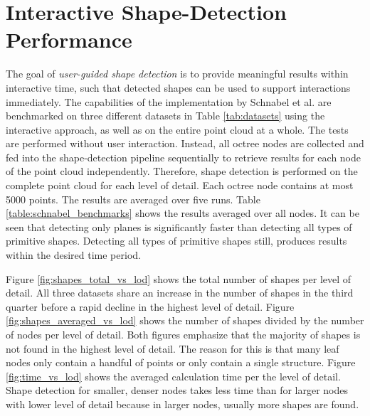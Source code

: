 \section{Interactive Shape-Detection Performance}
\label{sec:shape_detection_performance}

The goal of \textit{user-guided shape detection} is to provide meaningful results within interactive time, such that detected shapes can be used to support interactions immediately. The capabilities of the implementation by Schnabel et al. \cite{schnabel-2007-software} are benchmarked on three different datasets in Table \ref{tab:datasets} using the interactive approach, as well as on the entire point cloud at a whole. The tests are performed without user interaction. Instead, all octree nodes are collected and fed into the shape-detection pipeline sequentially to retrieve results for each node of the point cloud independently. Therefore, shape detection is performed on the complete point cloud for each level of detail. Each octree node contains at most 5000 points. The results are averaged over five runs. Table \ref{table:schnabel_benchmarks} shows the results averaged over all nodes. It can be seen that detecting only planes is significantly faster than detecting all types of primitive shapes. Detecting all types of primitive shapes still, produces results within the desired time period. 

\par

Figure \ref{fig:shapes_total_vs_lod} shows the total number of shapes per level of detail. All three datasets share an increase in the number of shapes in the third quarter before a rapid decline in the highest level of detail. 
Figure \ref{fig:shapes_averaged_vs_lod} shows the number of shapes divided by the number of nodes per level of detail. Both figures emphasize that the majority of shapes is not found in the highest level of detail. The reason for this is that many leaf nodes only contain a handful of points or only contain a single structure. 
Figure \ref{fig:time_vs_lod} shows the averaged calculation time per the level of detail. Shape detection for smaller, denser nodes takes less time than for larger nodes with lower level of detail because in larger nodes, usually more shapes are found. 

